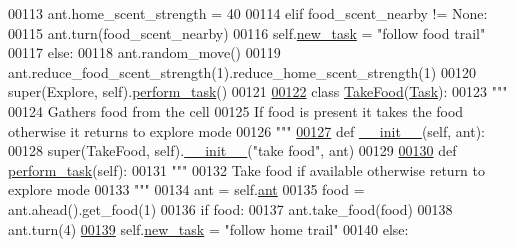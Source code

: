 \begin{DoxyCode}
00113                 ant.home\_scent\_strength = 40
00114             \textcolor{keywordflow}{elif} food\_scent\_nearby != \textcolor{keywordtype}{None}:
00115                 ant.turn(food\_scent\_nearby)
00116                 self.\hyperlink{classtask__manager_1_1Task_af16658f4c3c447e24f73ed3d1803e058}{new\_task} = \textcolor{stringliteral}{"follow food trail"}
00117             \textcolor{keywordflow}{else}:
00118                 ant.random\_move()
00119         ant.reduce\_food\_scent\_strength(1).reduce\_home\_scent\_strength(1)
00120         super(Explore, self).\hyperlink{classtask__manager_1_1Explore_a8ba5647950e170022bec93bc73c4a8de}{perform\_task}()
00121 
\hypertarget{task__manager_8py_source_l00122}{}\hyperlink{classtask__manager_1_1TakeFood}{00122} \textcolor{keyword}{class }\hyperlink{classtask__manager_1_1TakeFood}{TakeFood}(\hyperlink{classtask__manager_1_1Task}{Task}):
00123     \textcolor{stringliteral}{"""}
00124 \textcolor{stringliteral}{    Gathers food from the cell}
00125 \textcolor{stringliteral}{    If food is present it takes the food otherwise it returns to explore mode}
00126 \textcolor{stringliteral}{    """}
\hypertarget{task__manager_8py_source_l00127}{}\hyperlink{classtask__manager_1_1TakeFood_a4c5cc2bb37fc196bc5cb34f56fa62a29}{00127}     \textcolor{keyword}{def }\hyperlink{classtask__manager_1_1TakeFood_a4c5cc2bb37fc196bc5cb34f56fa62a29}{\_\_init\_\_}(self, ant):
00128         super(TakeFood, self).\hyperlink{classtask__manager_1_1TakeFood_a4c5cc2bb37fc196bc5cb34f56fa62a29}{\_\_init\_\_}(\textcolor{stringliteral}{"take food"}, ant)
00129 
\hypertarget{task__manager_8py_source_l00130}{}\hyperlink{classtask__manager_1_1TakeFood_af42eebb5d9ee945cafd05908d478bab3}{00130}     \textcolor{keyword}{def }\hyperlink{classtask__manager_1_1TakeFood_af42eebb5d9ee945cafd05908d478bab3}{perform\_task}(self):
00131         \textcolor{stringliteral}{"""}
00132 \textcolor{stringliteral}{        Take food if available otherwise return to explore mode}
00133 \textcolor{stringliteral}{        """}
00134         ant = self.\hyperlink{classtask__manager_1_1Task_ac43e25887825a1bb6e3d4a5a049968be}{ant}
00135         food = ant.ahead().get\_food(1)
00136         \textcolor{keywordflow}{if} food:
00137             ant.take\_food(food)
00138             ant.turn(4)
\hypertarget{task__manager_8py_source_l00139}{}\hyperlink{classtask__manager_1_1TakeFood_a592252f7a2b882cf283c9da9cbab07a2}{00139}             self.\hyperlink{classtask__manager_1_1Task_af16658f4c3c447e24f73ed3d1803e058}{new\_task} = \textcolor{stringliteral}{"follow home trail"}
00140         \textcolor{keywordflow}{else}:

\end{DoxyCode}
